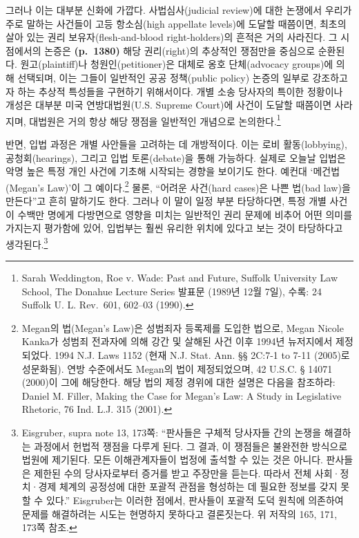 \documentclass[a4paper,12pt,oneside]{article}  %
\begin{document}
그러나 이는 대부분 신화에 가깝다. 사법심사(judicial review)에 대한
논쟁에서 우리가 주로 말하는 사건들이 고등 항소심(high appellate
levels)에 도달할 때쯤이면, 최초의 살아 있는 권리 보유자(flesh-and-blood
right-holders)의 흔적은 거의 사라진다. 그 시점에서의 논증은
\textbf{(p.~1380)} 해당 권리(right)의 추상적인 쟁점만을 중심으로
순환된다. 원고(plaintiff)나 청원인(petitioner)은 대체로 옹호
단체(advocacy groups)에 의해 선택되며, 이는 그들이 일반적인 공공
정책(public policy) 논증의 일부로 강조하고자 하는 추상적 특성들을
구현하기 위해서이다. 개별 소송 당사자의 특이한 정황이나 개성은 대부분
미국 연방대법원(U.S. Supreme Court)에 사건이 도달할 때쯤이면 사라지며,
대법원은 거의 항상 해당 쟁점을 일반적인 개념으로 논의한다.\footnote{Sarah
  Weddington, Roe v. Wade: Past and Future, Suffolk University Law
  School, The Donahue Lecture Series 발표문 (1989년 12월 7일), 수록: 24
  Suffolk U. L. Rev.~601, 602--03 (1990).}

반면, 입법 과정은 개별 사안들을 고려하는 데 개방적이다. 이는 로비
활동(lobbying), 공청회(hearings), 그리고 입법 토론(debate)을 통해
가능하다. 실제로 오늘날 입법은 악명 높은 특정 개인 사건에 기초해
시작되는 경향을 보이기도 한다. 예컨대 `메건법(Megan's Law)'이 그
예이다.\footnote{Megan의 법(Megan's Law)은 성범죄자 등록제를 도입한
  법으로, Megan Nicole Kanka가 성범죄 전과자에 의해 강간 및 살해된 사건
  이후 1994년 뉴저지에서 제정되었다. 1994 N.J. Laws 1152 (현재 N.J.
  Stat. Ann. §§ 2C:7-1 to 7-11 (2005)로 성문화됨). 연방 수준에서도
  Megan의 법이 제정되었으며, 42 U.S.C. § 14071 (2000)이 그에 해당한다.
  해당 법의 제정 경위에 대한 설명은 다음을 참조하라: Daniel M. Filler,
  Making the Case for Megan's Law: A Study in Legislative Rhetoric, 76
  Ind. L.J. 315 (2001).} 물론, ``어려운 사건(hard cases)은 나쁜 법(bad
law)을 만든다''고 흔히 말하기도 한다. 그러나 이 말이 일정 부분
타당하다면, 특정 개별 사건이 수백만 명에게 다방면으로 영향을 미치는
일반적인 권리 문제에 비추어 어떤 의미를 가지는지 평가함에 있어, 입법부는
훨씬 유리한 위치에 있다고 보는 것이 타당하다고 생각된다.\footnote{Eisgruber,
  supra note 13, 173쪽: ``판사들은 구체적 당사자들 간의 논쟁을 해결하는
  과정에서 헌법적 쟁점을 다루게 된다. 그 결과, 이 쟁점들은 불완전한
  방식으로 법원에 제기된다. 모든 이해관계자들이 법정에 출석할 수 있는
  것은 아니다. 판사들은 제한된 수의 당사자로부터 증거를 받고 주장만을
  듣는다. 따라서 전체 사회·정치·경제 체계의 공정성에 대한 포괄적 관점을
  형성하는 데 필요한 정보를 갖지 못할 수 있다.'' Eisgruber는 이러한
  점에서, 판사들이 포괄적 도덕 원칙에 의존하여 문제를 해결하려는 시도는
  현명하지 못하다고 결론짓는다. 위 저작의 165, 171, 173쪽 참조.}
\end{document}
